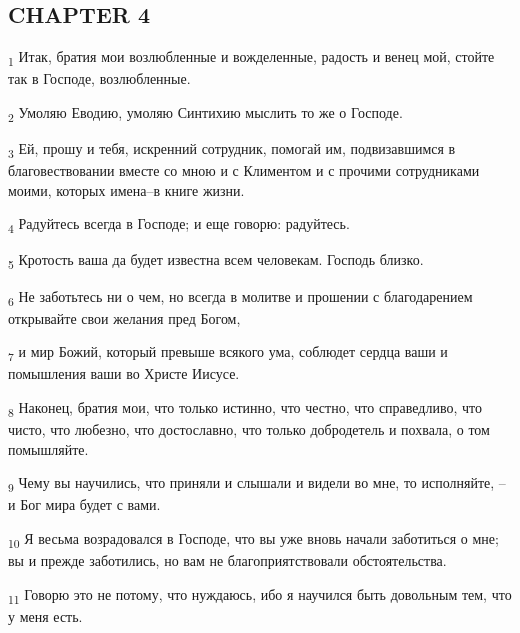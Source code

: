 \subsection{CHAPTER 4}
\begin{tcolorbox}
\textsubscript{1} Итак, братия мои возлюбленные и вожделенные, радость и венец мой, стойте так в Господе, возлюбленные.
\end{tcolorbox}
\begin{tcolorbox}
\textsubscript{2} Умоляю Еводию, умоляю Синтихию мыслить то же о Господе.
\end{tcolorbox}
\begin{tcolorbox}
\textsubscript{3} Ей, прошу и тебя, искренний сотрудник, помогай им, подвизавшимся в благовествовании вместе со мною и с Климентом и с прочими сотрудниками моими, которых имена--в книге жизни.
\end{tcolorbox}
\begin{tcolorbox}
\textsubscript{4} Радуйтесь всегда в Господе; и еще говорю: радуйтесь.
\end{tcolorbox}
\begin{tcolorbox}
\textsubscript{5} Кротость ваша да будет известна всем человекам. Господь близко.
\end{tcolorbox}
\begin{tcolorbox}
\textsubscript{6} Не заботьтесь ни о чем, но всегда в молитве и прошении с благодарением открывайте свои желания пред Богом,
\end{tcolorbox}
\begin{tcolorbox}
\textsubscript{7} и мир Божий, который превыше всякого ума, соблюдет сердца ваши и помышления ваши во Христе Иисусе.
\end{tcolorbox}
\begin{tcolorbox}
\textsubscript{8} Наконец, братия мои, что только истинно, что честно, что справедливо, что чисто, что любезно, что достославно, что только добродетель и похвала, о том помышляйте.
\end{tcolorbox}
\begin{tcolorbox}
\textsubscript{9} Чему вы научились, что приняли и слышали и видели во мне, то исполняйте, --и Бог мира будет с вами.
\end{tcolorbox}
\begin{tcolorbox}
\textsubscript{10} Я весьма возрадовался в Господе, что вы уже вновь начали заботиться о мне; вы и прежде заботились, но вам не благоприятствовали обстоятельства.
\end{tcolorbox}
\begin{tcolorbox}
\textsubscript{11} Говорю это не потому, что нуждаюсь, ибо я научился быть довольным тем, что у меня есть.
\end{tcolorbox}
